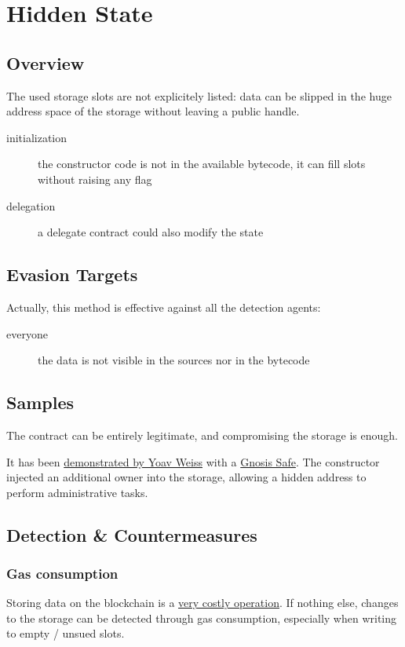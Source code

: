 \section{Hidden State} \label{sec:hidden-state}

\subsection{Overview}

The used storage slots are not explicitely listed: data can be slipped in the huge address space of the storage without leaving a public handle.

\begin{description}
\item[initialization]{the constructor code is not in the available bytecode, it can fill slots without raising any flag}
\item[delegation]{a delegate contract could also modify the state}
\end{description}

\subsection{Evasion Targets}

Actually, this method is effective against all the detection agents:

\begin{description}
\item[everyone]{the data is not visible in the sources nor in the bytecode}
\end{description}

\subsection{Samples}

The contract can be entirely legitimate, and compromising the storage is enough.

It has been \href{\urlvideomasqueradingcode}{demonstrated by Yoav Weiss} with a \href{https://github.com/safe-global/safe-contracts}{Gnosis Safe}.
The constructor injected an additional owner into the storage, allowing a hidden address to perform administrative tasks.

\subsection{Detection \& Countermeasures}

\subsubsection{Gas consumption}

Storing data on the blockchain is a \href{\urldocsgascost}{very costly operation}.
If nothing else, changes to the storage can be detected through gas consumption, especially when writing to empty / unsued slots.
